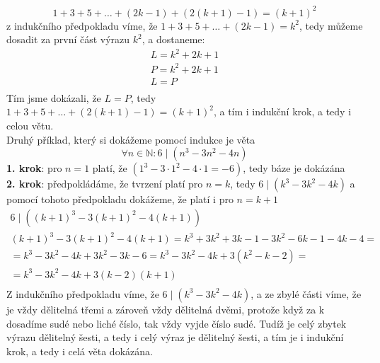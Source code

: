 \documentclass[12pt]{article}
\begin{document}
\[1 + 3 + 5 + \dots + (2k-1) + (2(k+1)-1) = (k+1)^2\]
z indukčního předpokladu víme, že $1 + 3 + 5 + \dots + (2k-1) = k^2$, tedy můžeme dosadit za první část výrazu $k^2$, a dostaneme:
\begin{align*}
L = k^2 + 2k + 1\\
P = k^2 + 2k + 1\\
L = P\\
\end{align*}
Tím jsme dokázali, že $L = P$, tedy $1 + 3 + 5 + \dots + (2(k+1)-1) = (k+1)^2$, a tím i indukční krok, a tedy i celou větu.\\

Druhý příklad, který si dokážeme pomocí indukce je věta \[\forall n \in \mathbb{N}: 6\mid(n^3 -3n^2 - 4n)\]
\textbf{1. krok}: pro $n = 1$ platí, že $(1^3 -3\cdot 1^2 - 4\cdot 1 = -6)$, tedy báze je dokázána\\
\textbf{2. krok}: předpokládáme, že tvrzení platí pro $n = k$, tedy $6\mid(k^3 -3k^2 - 4k)$
a pomocí tohoto předpokladu dokážeme, že platí i pro $n = k + 1$
\begin{align*}
6\mid((k+1)^3 -3(k+1)^2 - 4(k+1))\\
(k+1)^3 -3(k+1)^2 - 4(k+1) = k^3 + 3k^2 + 3k - 1 - 3k^2 - 6k - 1 - 4k - 4 =\\
= k^3 - 3k^2 - 4k + 3k^2 - 3k -6 = k^3 - 3k^2 - 4k + 3(k^2 - k -2) = \\
= k^3 - 3k^2 - 4k + 3(k-2)(k + 1)\\
\end{align*}
Z indukčního předpokladu víme, že $6\mid(k^3 -3k^2 - 4k)$, a ze zbylé části víme, že je vždy dělitelná třemi a zároveň vždy dělitelná dvěmi, protože když za k dosadíme sudé nebo liché číslo, tak vždy vyjde číslo sudé. Tudíž je celý zbytek výrazu dělitelný šesti, a tedy i celý výraz je dělitelný šesti, a tím je i indukční krok, a tedy i celá věta dokázána.
\end{document}
